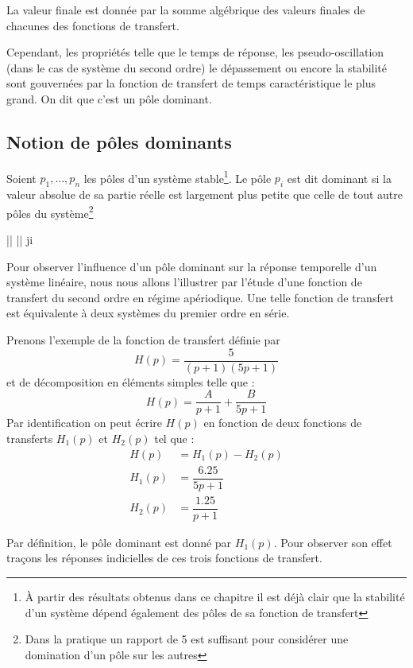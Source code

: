 La valeur finale est donnée par la somme algébrique des valeurs finales de chacunes
des fonctions de transfert.

Cependant, les propriétés telle que le temps de réponse, 
les pseudo-oscillation (dans le cas de système du second ordre) 
le dépassement ou encore la stabilité sont gouvernées 
par la fonction de transfert de 
temps caractéristique le plus grand. On dit que c'est un pôle dominant.

\subsection{Notion de pôles dominants}

Soient $p_1,\ldots,p_n$ les pôles d'un système stable\footnote{À partir 
des résultats obtenus dans ce chapitre il est déjà clair que la stabilité
d'un système dépend également des pôles de sa fonction de transfert}.
Le pôle $p_i$ est dit dominant si la valeur absolue
de sa partie réelle est largement plus petite que celle de tout autre pôles 
du système\footnote{Dans la pratique un rapport de 5 est 
suffisant pour considérer une domination d'un pôle sur les autres}
\begin{bequation}
	\big|\big| \ll \big|\big|\;\; \forall j\neq i
\end{bequation}

Pour observer l'influence d'un pôle dominant sur 
la réponse temporelle d'un système linéaire, nous
nous allons l'illustrer par l'étude d'une fonction 
de transfert du second ordre en régime apériodique.
Une telle fonction de transfert est équivalente à deux
systèmes du premier ordre en série.

Prenons l'exemple de la fonction de transfert définie par  
$$
H(p)=\dfrac{5}{(p+1)(5p+1)}
$$
et de décomposition en éléments simples telle que :
$$
H(p)=\dfrac{A}{p+1}+\dfrac{B}{5p+1}
$$
Par identification on peut écrire $H(p)$ en fonction de
deux fonctions de transferts $H_1(p)$ et $H_2(p)$ tel que :
\begin{align*}
	H(p)&=H_1(p)-H_2(p)\\
	H_1(p)&=\dfrac{6.25}{5p+1}\\
	H_2(p)&=\dfrac{1.25}{p+1}
\end{align*}

Par définition, le pôle dominant est donné par $H_1(p)$.
Pour observer son effet traçons les réponses indicielles 
de ces trois fonctions de transfert.

